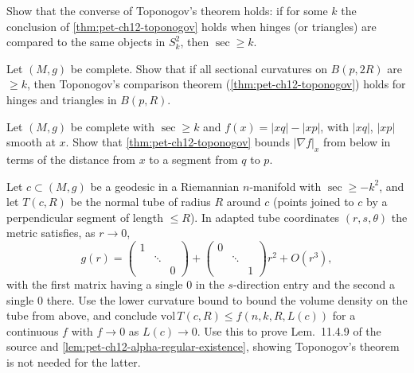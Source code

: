 \begin{remark}
  \label{rem:pet-ch12-ex-12-8-4}

  Show that the converse of Toponogov's theorem holds: if for some $k$ the
  conclusion of \cref{thm:pet-ch12-toponogov} holds when hinges (or triangles)
  are compared to the same objects in $S_k^2$, then $\sec\ge k$.
\end{remark}

\begin{remark}
  \label{rem:pet-ch12-ex-12-8-5}

  Let $(M,g)$ be complete. Show that if all sectional curvatures on $B(p,2R)$
  are $\ge k$, then Toponogov's comparison theorem
  (\cref{thm:pet-ch12-toponogov}) holds for hinges and triangles in $B(p,R)$.
\end{remark}

\begin{remark}
  \label{rem:pet-ch12-ex-12-8-6}

  Let $(M,g)$ be complete with $\sec\ge k$ and $f(x)=|xq|-|xp|$, with $|xq|$,
  $|xp|$ smooth at $x$. Show that \cref{thm:pet-ch12-toponogov} bounds
  $|\nabla f|_x$ from below in terms of the distance from $x$ to a segment from
  $q$ to $p$.
\end{remark}

\begin{remark}
  \label{rem:pet-ch12-ex-12-8-7}

  Let $c\subset(M,g)$ be a geodesic in a Riemannian $n$-manifold with
  $\sec\ge-k^2$, and let $T(c,R)$ be the normal tube of radius $R$ around $c$
  (points joined to $c$ by a perpendicular segment of length $\le R$). In
  adapted tube coordinates $(r,s,\theta)$ the metric satisfies, as $r\to0$,
  \[
    g(r)=\begin{pmatrix}1&&\\&\ddots&\\&&0\end{pmatrix}
    +\begin{pmatrix}0&&\\&\ddots&\\&&1\end{pmatrix}r^2+O(r^3),
  \]
  with the first matrix having a single $0$ in the $s$-direction entry and the
  second a single $0$ there. Use the lower curvature bound to bound the volume
  density on the tube from above, and conclude
  $\mathrm{vol}\,T(c,R)\le f(n,k,R,L(c))$ for a continuous $f$ with
  $f\to0$ as $L(c)\to0$. Use this to prove Lem.\ 11.4.9 of the source and
  \cref{lem:pet-ch12-alpha-regular-existence}, showing Toponogov's theorem is
  not needed for the latter.
\end{remark}


